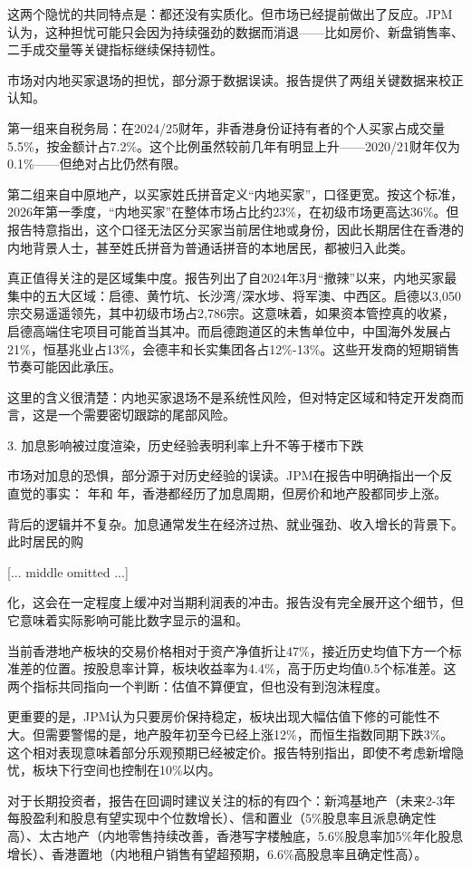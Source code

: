\documentclass[11pt]{ctexart}
\begin{document}
这两个隐忧的共同特点是：都还没有实质化。但市场已经提前做出了反应。JPM认为，这种担忧可能只会因为持续强劲的数据而消退——比如房价、新盘销售率、二手成交量等关键指标继续保持韧性。

市场对内地买家退场的担忧，部分源于数据误读。报告提供了两组关键数据来校正认知。

第一组来自税务局：在2024/25财年，非香港身份证持有者的个人买家占成交量5.5\%，按金额计占7.2\%。这个比例虽然较前几年有明显上升——2020/21财年仅为0.1\%——但绝对占比仍然有限。

第二组来自中原地产，以买家姓氏拼音定义“内地买家”，口径更宽。按这个标准，2026年第一季度，“内地买家”在整体市场占比约23\%，在初级市场更高达36\%。但报告特意指出，这个口径无法区分买家当前居住地或身份，因此长期居住在香港的内地背景人士，甚至姓氏拼音为普通话拼音的本地居民，都被归入此类。

真正值得关注的是区域集中度。报告列出了自2024年3月“撤辣”以来，内地买家最集中的五大区域：启德、黄竹坑、长沙湾/深水埗、将军澳、中西区。启德以3,050宗交易遥遥领先，其中初级市场占2,786宗。这意味着，如果资本管控真的收紧，启德高端住宅项目可能首当其冲。而启德跑道区的未售单位中，中国海外发展占21\%，恒基兆业占13\%，会德丰和长实集团各占12\%-13\%。这些开发商的短期销售节奏可能因此承压。

这里的含义很清楚：内地买家退场不是系统性风险，但对特定区域和特定开发商而言，这是一个需要密切跟踪的尾部风险。

3. 加息影响被过度渲染，历史经验表明利率上升不等于楼市下跌

市场对加息的恐惧，部分源于对历史经验的误读。JPM在报告中明确指出一个反直觉的事实： 年和 年，香港都经历了加息周期，但房价和地产股都同步上涨。

背后的逻辑并不复杂。加息通常发生在经济过热、就业强劲、收入增长的背景下。此时居民的购

[... middle omitted ...]

化，这会在一定程度上缓冲对当期利润表的冲击。报告没有完全展开这个细节，但它意味着实际影响可能比数字显示的温和。

当前香港地产板块的交易价格相对于资产净值折让47\%，接近历史均值下方一个标准差的位置。按股息率计算，板块收益率为4.4\%，高于历史均值0.5个标准差。这两个指标共同指向一个判断：估值不算便宜，但也没有到泡沫程度。

更重要的是，JPM认为只要房价保持稳定，板块出现大幅估值下修的可能性不大。但需要警惕的是，地产股年初至今已经上涨12\%，而恒生指数同期下跌3\%。这个相对表现意味着部分乐观预期已经被定价。报告特别指出，即使不考虑新增隐忧，板块下行空间也控制在10\%以内。

对于长期投资者，报告在回调时建议关注的标的有四个：新鸿基地产（未来2-3年每股盈利和股息有望实现中个位数增长）、信和置业（5\%股息率且派息确定性高）、太古地产（内地零售持续改善，香港写字楼触底，5.6\%股息率加5\%年化股息增长）、香港置地（内地租户销售有望超预期，6.6\%高股息率且确定性高）。
\end{document}
